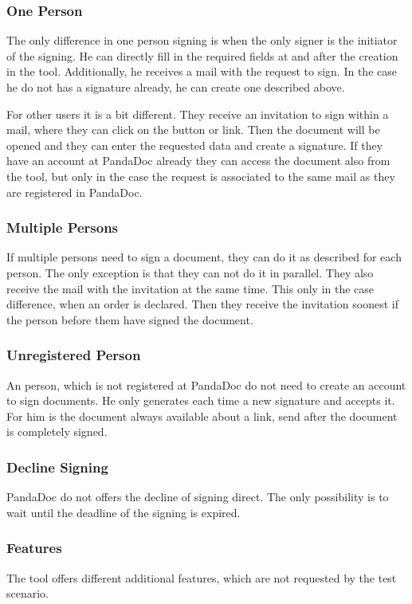 \subsubsection{One Person}
The only difference in one person signing is when the only signer is the initiator of the signing. He can directly fill in the required fields at and after the creation in the tool. Additionally, he receives a mail with the request to sign. In the case he do not has a signature already, he can create one described above.

For other users it is a bit different. They receive an invitation to sign within a mail, where they can click on the button or link. Then the document will be opened and they can enter the requested data and create a signature. If they have an account at PandaDoc already they can access the document also from the tool, but only in the case the request is associated to the same mail as they are registered in PandaDoc. 

\subsubsection{Multiple Persons}
If multiple persons need to sign a document, they can do it as described for each person. The only exception is that they can not do it in parallel. They also receive the mail with the invitation at the same time. This only in the case difference, when an order is declared. Then they receive the invitation soonest if the person before them have signed the document.

\subsubsection{Unregistered Person}
An person, which is not registered at PandaDoc do not need to create an account to sign documents. He only generates each time a new signature and accepts it. For him is the document always available about a link, send after the document is completely signed.  

\subsubsection{Decline Signing}
PandaDoc do not offers the decline of signing direct. The only possibility is to wait until the deadline of the signing is expired.

\subsubsection{Features}
The tool offers different additional features, which are not requested by the test scenario.

